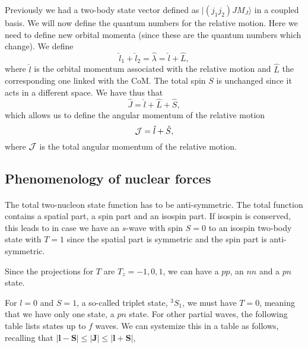 \documentclass[%
twoside,                 %
final,                   %
10pt]{article}
\begin{document}
Previously we had a two-body state vector defined as $|(j_1j_2)JM_J\rangle$ in a coupled basis. 
We will now define the quantum numbers for the relative motion. Here we need to define new orbital momenta (since these are the quantum numbers which change). 
We define 
\[
\hat{l}_1+\hat{l}_2=\hat{\lambda}=\hat{l}+\hat{L},
\]
where $\hat{l}$ is the orbital momentum associated with the relative motion and
$\hat{L}$ the corresponding one linked with the CoM. The total spin $S$ is unchanged since it acts in a different space. We have thus that
\[
\hat{J}=\hat{l}+\hat{L}+\hat{S},
\]
which allows us to define the angular momentum of the relative motion
\[
{ \cal J} =  \hat{l}+\hat{S},
\]
where ${ \cal J}$ is the total angular momentum of the relative motion.



\subsection*{Phenomenology of nuclear forces}

\paragraph{}

The total two-nucleon state function has to be anti-symmetric. The total function contains a spatial part, a spin part and an isospin part. If isospin is conserved, this leads to in case we have an $s$-wave with spin $S=0$ to an isospin 
two-body state with $T=1$ since the spatial part is symmetric and the spin part is anti-symmetric. 

Since the projections for $T$ are $T_z=-1,0,1$, we can have a $pp$, an $nn$ and a $pn$ state.

For $l=0$ and $S=1$, a so-called triplet state, $^3S_1$, we must have $T=0$, meaning that we have only one state, a $pn$ state. For other partial waves, the following table lists states up to $f$ waves.
We can systemize this in a table as follows, recalling that $|\mathbf{l}-\mathbf{S}| \le |\mathbf{J}| \le |\mathbf{l}+\mathbf{S}|$,  
\end{document}
